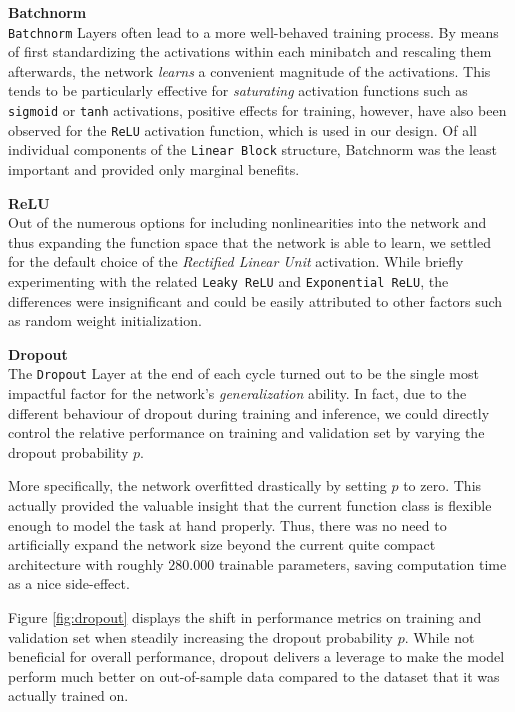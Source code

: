 \documentclass[12pt, letterpaper]{article}
\begin{document}
\textbf{Batchnorm} \\
\texttt{Batchnorm} Layers often lead to a more well-behaved training process.
By means of first standardizing the activations within each minibatch and rescaling them afterwards, the network \emph{learns} a convenient magnitude of the activations.
This tends to be particularly effective for \emph{saturating} activation functions such as \texttt{sigmoid} or \texttt{tanh} activations, positive effects for training, however, have also been observed for the \texttt{ReLU} activation function, which is used in our design.
Of all individual components of the \texttt{Linear Block} structure, Batchnorm was the least important and provided only marginal benefits.

\textbf{ReLU} \\
Out of the numerous options for including nonlinearities into the network and thus expanding the function space that the network is able to learn, we settled for the default choice of the \emph{Rectified Linear Unit} activation.
While briefly experimenting with the related \texttt{Leaky ReLU} and \texttt{Exponential ReLU}, the differences were insignificant and could be easily attributed to other factors such as random weight initialization.

\textbf{Dropout} \\
The \texttt{Dropout} Layer at the end of each cycle turned out to be the single most impactful factor for the network's \emph{generalization} ability.
In fact, due to the different behaviour of dropout during training and inference, we could directly control the relative performance on training and validation set by varying the dropout probability $p$.

More specifically, the network overfitted drastically by setting $p$ to zero.
This actually provided the valuable insight that the current function class is flexible enough to model the task at hand properly.
Thus, there was no need to artificially expand the network size beyond the current quite compact architecture with roughly $280.000$ trainable parameters, saving computation time as a nice side-effect.

Figure \ref{fig:dropout} displays the shift in performance metrics on training and validation set when steadily increasing the dropout probability $p$.
While not beneficial for overall performance, dropout delivers a leverage to make the model perform much better on out-of-sample data compared to the dataset that it was actually trained on.
\end{document}
